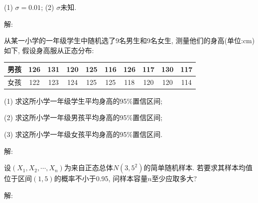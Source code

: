 \documentclass[standard]{ExBook}
\begin{document}
\begin{qitems}
\begin{bbox}
\begin{shaded}
(1) $\sigma=0.01$; \qquad (2) $\sigma$未知.
    \end{shaded}
    \end{bbox}

\vspace{-5em}

    \begin{bbox}
解: 
    \end{bbox}

\vspace{-5em}

    \begin{bbox}
    \begin{shaded}
        \qitem
从某一小学的一年级学生中随机选了9名男生和9名女生, 测量他们的身高(单位:cm)如下, 假设身高服从正态分布:
\begin{center}
\setlength{\tabcolsep}{15pt}
\begin{tabular}{c|ccccccccc}
    \hline
    男孩 & 126 & 131 & 120 & 125 & 116 & 126 & 117 & 130 & 117\\
    \hline
    女孩 & 122 & 123 & 124 & 125 & 125 & 118 & 120 & 120 & 114\\
    \hline
\end{tabular}
\end{center}
(1) 求这所小学一年级学生平均身高的95\%置信区间;

(2) 求这所小学一年级男孩平均身高的95\%置信区间;

(3) 求这所小学一年级女孩平均身高的95\%置信区间.
    \end{shaded}
    \end{bbox}

\vspace{-5em}

    \begin{bbox}
解: 
    \end{bbox}

\vspace{-5em}

    \begin{bbox}
    \begin{shaded}
        \qitem
设$(X_1,X_2,\cdots,X_n)$为来自正态总体$N(3,5^2)$的简单随机样本. 若要求其样本均值位于区间$(1, 5)$的概率不小于0.95, 问样本容量$n$至少应取多大?
    \end{shaded}
    \end{bbox}

\vspace{-5em}

    \begin{bbox}
解: 
    \end{bbox}


\end{qitems}
\end{document}
